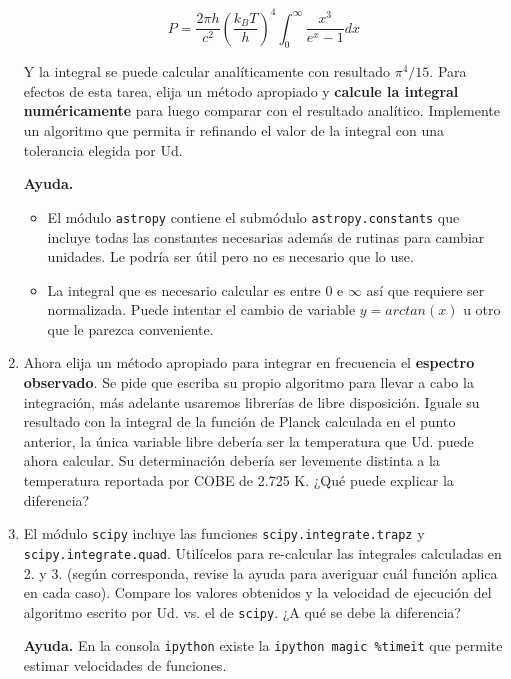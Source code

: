 \documentclass[letter, 11pt]{article}
\begin{document}
\begin{enumerate}
    $$P = \frac{2 \pi h}{c^2} \left(\frac{k_BT}{h}\right)^4
    \int_0^\infty\frac{x^3}{e^x - 1} dx $$

    Y la integral se puede calcular analíticamente con resultado $\pi^4/15$.
    Para efectos de esta tarea, elija un método apropiado y {\bf calcule la
    integral numéricamente} para luego comparar con el resultado analítico.
    Implemente un algoritmo que permita ir refinando el valor de la integral
    con una tolerancia elegida por Ud.

    \begin{ayuda}
      \small
      {\bf Ayuda.}
      \begin{itemize}
        \item El módulo \texttt{astropy} contiene el submódulo
          \texttt{astropy.constants} que incluye todas las constantes
          necesarias además de rutinas para cambiar unidades. Le podría ser
          útil pero no es necesario que lo use.
        \item La integral que es necesario calcular es entre $0$ e $\infty$ así
          que requiere ser normalizada. Puede intentar el cambio de variable $y
          = arctan(x)$ u otro que le parezca conveniente.
      \end{itemize}
    \end{ayuda}

  \item Ahora elija un método apropiado para integrar en frecuencia el {\bf
    espectro observado}. Se pide que escriba su propio algoritmo para llevar a cabo
    la integración, más adelante usaremos librerías de libre disposición.
    Iguale su resultado con la integral de la función de Planck calculada en el
    punto anterior, la única variable libre debería ser la temperatura que Ud.
    puede ahora calcular. Su determinación debería ser levemente distinta a 
    la temperatura reportada por COBE de 2.725 K. ¿Qué puede explicar la
    diferencia?

  \item El módulo \texttt{scipy} incluye las funciones
    \texttt{scipy.integrate.trapz} y \texttt{scipy.integrate.quad}.  Utilícelos
    para re-calcular las integrales calculadas en 2. y 3. (según corresponda,
    revise la ayuda para averiguar cuál función aplica en cada caso). Compare
    los valores obtenidos y la velocidad de ejecución del algoritmo escrito por
    Ud. vs. el de \texttt{scipy}. ¿A qué se debe la diferencia?

      \begin{ayuda}
        \small
        {\bf Ayuda.}
        En la consola \texttt{ipython} existe la \texttt{ipython magic
        \%timeit} que permite estimar velocidades de funciones.
      \end{ayuda}

\end{enumerate}
\end{document}
